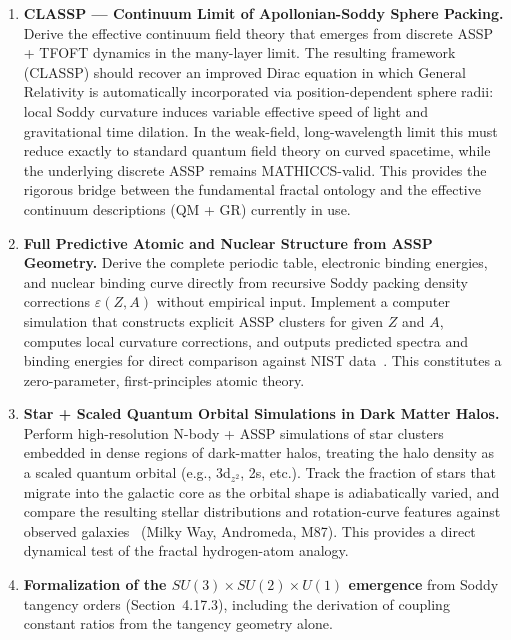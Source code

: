 \documentclass[11pt,a4paper]{article}
\begin{document}
\begin{enumerate}

  \item \textbf{CLASSP --- Continuum Limit of Apollonian-Soddy Sphere Packing.} Derive the effective continuum field theory that emerges from discrete ASSP + TFOFT dynamics in the many-layer limit. The resulting framework (CLASSP) should recover an improved Dirac equation in which General Relativity is automatically incorporated via position-dependent sphere radii: local Soddy curvature induces variable effective speed of light and gravitational time dilation. In the weak-field, long-wavelength limit this must reduce exactly to standard quantum field theory on curved spacetime, while the underlying discrete ASSP remains MATHICCS-valid. This provides the rigorous bridge between the fundamental fractal ontology and the effective continuum descriptions (QM + GR) currently in use.

  \item \textbf{Full Predictive Atomic and Nuclear Structure from ASSP Geometry.} Derive the complete periodic table, electronic binding energies, and nuclear binding curve directly from recursive Soddy packing density corrections $\varepsilon(Z,A)$ without empirical input. Implement a computer simulation that constructs explicit ASSP clusters for given $Z$ and $A$, computes local curvature corrections, and outputs predicted spectra and binding energies for direct comparison against NIST data~\cite{CODATA2022}. This constitutes a zero-parameter, first-principles atomic theory.

  \item \textbf{Star + Scaled Quantum Orbital Simulations in Dark Matter Halos.} Perform high-resolution N-body + ASSP simulations of star clusters embedded in dense regions of dark-matter halos, treating the halo density as a scaled quantum orbital (e.g., 3d$_{z^2}$, 2s, etc.). Track the fraction of stars that migrate into the galactic core as the orbital shape is adiabatically varied, and compare the resulting stellar distributions and rotation-curve features against observed galaxies~\cite{Sofue2012,Chemin2009} (Milky Way, Andromeda, M87). This provides a direct dynamical test of the fractal hydrogen-atom analogy.

  \item \textbf{Formalization of the $SU(3)\times SU(2)\times U(1)$ emergence} from Soddy tangency orders (Section~4.17.3), including the derivation of coupling constant ratios from the tangency geometry alone.


\end{enumerate}
\end{document}
